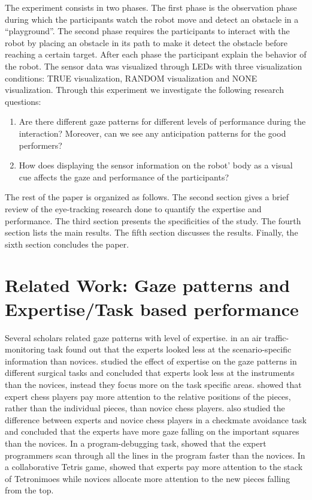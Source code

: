 \documentclass{sig-alternate}
\begin{document}
The experiment consists in two phases. The first phase is the observation phase
during which the participants watch the robot move and detect an obstacle in a
``playground''. The second phase requires the participants to interact with the
robot by placing an obstacle in its path to make it detect the obstacle before
reaching a certain target.  After each phase the participant explain the
behavior of the robot. The sensor data was visualized through LEDs with three
visualization conditions: TRUE visualization, RANDOM visualization and NONE
visualization. Through this experiment we investigate the following research
questions:

\begin{enumerate}
    \item Are there different gaze patterns for different levels of performance
during the interaction? Moreover, can we see any anticipation patterns
for the good performers?

    \item How does displaying the sensor information on the robot' body as a
visual cue affects the gaze and performance of the participants?
\end{enumerate}

The rest of the paper is organized as follows. The second section gives
a brief review of the eye-tracking research done to quantify the
expertise and performance. The third section presents the specificities
of the study. The fourth section lists the main results. The fifth
section discusses the results. Finally, the sixth section concludes the
paper.


\section{Related Work: Gaze patterns and Expertise/Task based performance}

Several scholars related gaze patterns with level of expertise.
\cite{hasse2012measure} in an air traffic-monitoring task found out that the
experts looked less at the scenario-specific information than novices.
\cite{eivazi2012gaze, law2004eye, tien2010measuring} studied the effect of
expertise on the gaze patterns in different surgical tasks and concluded that
experts look less at the instruments than the novices, instead they focus more
on the task specific areas. \cite{reingold2001visual} showed that expert chess
players pay more attention to the relative positions of the pieces, rather than
the individual pieces, than novice chess players. \cite{blignaut2008visual} also
studied the difference between experts and novice chess players in a checkmate
avoidance task and concluded that the experts have more gaze falling on the
important squares than the novices. In a program-debugging task,
\cite{sharif2012eye} showed that the expert programmers scan through all the
lines in the program faster than the novices. In a collaborative Tetris game,
\cite{jermann2010using} showed that experts pay more attention to the stack of
Tetronimoes while novices allocate more attention to the new pieces falling from
the top.
\end{document}
